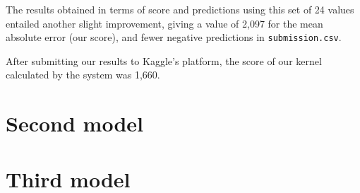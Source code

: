 The results obtained in terms of score and predictions using this set of 24 values entailed another slight improvement, giving a value of 2,097 for the mean absolute error (our score), and fewer negative predictions in \texttt{submission.csv}.

After submitting our results to Kaggle's platform, the score of our kernel calculated by the system was 1,660.

\section[Second model]{Second model}


\section[Third model]{Third model}


